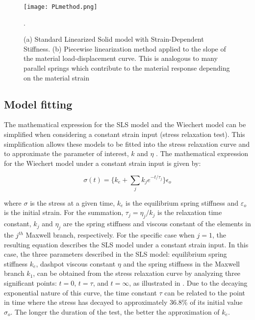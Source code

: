 \begin{figure}[htb!]
	\centering
    \texttt{[image: PLmethod.png]}
    \caption{(a) Standard Linearized Solid model with Strain-Dependent Stiffness. (b) Piecewise linearization method applied to the slope of the material load-displacement curve. This is analogous to many parallel springs which contribute to the material response depending on the material strain \cite{austin2015control}}.
    \label{fig:PLmethod}
\end{figure}

\subsection{Model fitting} \label{sec:Modelfit}

The mathematical expression for the SLS model and the Wiechert model can be simplified when considering a constant strain input (stress relaxation test). This simplification allows these models to be fitted into the stress relaxation curve and to approximate the parameter of interest, $k$ and $\eta$ \cite{roylance2001engineering}. The mathematical expression for the Wiechert model under a constant strain input is given by:

\begin{equation}
\label{eq1}
\sigma(t)=\Bigg\{k_e +  \sum_{j} k_j e^{-t/\tau_j}\Bigg\}\epsilon_o
\end{equation}

\noindent where $\sigma$ is the stress at a given time, $k_e$ is the equilibrium spring stiffness and $\varepsilon_o$ is the initial strain. For the summation, $\tau_j=\eta_j/k_j$ is the relaxation time constant, $k_j$ and $\eta_j$ are the spring stiffness and viscous constant of the elements in the $j^{th}$ Maxwell branch, respectively. For the specific case when $j = 1$, the resulting equation describes the SLS model under a constant strain input. In this case, the three parameters described in the SLS model: equilibrium spring stiffness $k_e$, dashpot viscous constant $\eta$ and the spring stiffness in the Maxwell branch $k_1$, can be obtained from the stress relaxation curve by analyzing three significant points: $t=0$, $t=\tau$, and $t=\infty$, as illustrated in . Due to the decaying exponential nature of this curve, the time constant $\tau$ can be related to the point in time where the stress has decayed to approximately 36.8\% of its initial value $\sigma_o$. The longer the duration of the test, the better the approximation of $k_e$.

